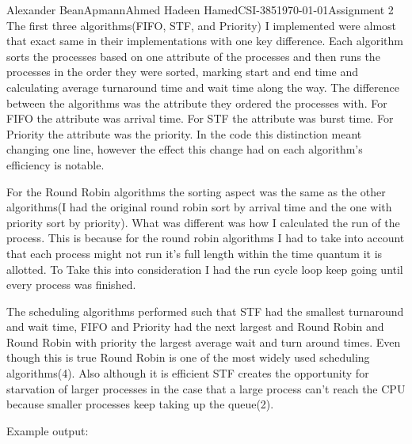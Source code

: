 \documentclass[12pt,letterpaper]{article}
\begin{document}
\begin{mla}{Alexander Bean}{Apmann}{Ahmed Hadeen Hamed}{CSI-385}{\today}{Assignment 2}
The first three algorithms(FIFO, STF, and Priority) I implemented were almost that exact same in their implementations with one key difference. Each algorithm sorts the processes based on one attribute of the processes and then runs the processes in the order they were sorted, marking start and end time and calculating average turnaround time and wait time along the way. The difference between the algorithms was the attribute they ordered the processes with. For FIFO the attribute was arrival time. For STF the attribute was burst time. For Priority the attribute was the priority. In the code this distinction meant changing one line, however the effect this change had on each algorithm's efficiency is notable.

For the Round Robin algorithms the sorting aspect was the same as the other algorithms(I had the original round robin sort by arrival time and the one with priority sort by priority). What was different was how I calculated the run of the process. This is because for the round robin algorithms I had to take into account that each process might not run it's full length within the time quantum it is allotted. To Take this into consideration I had the run cycle loop keep going until every process was finished.

The scheduling algorithms performed such that STF had the smallest turnaround and wait time, FIFO and Priority had the next largest and Round Robin and Round Robin with priority the largest average wait and turn around times. Even though this is true Round Robin is one of the most widely used scheduling algorithms(4). Also although it is efficient STF creates the opportunity for starvation of larger processes in the case that a large process can't reach the CPU because smaller processes keep taking up the queue(2).

Example output:


\end{mla}
\end{document}
